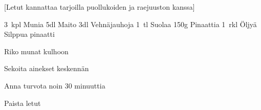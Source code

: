 [Letut kannattaa tarjoilla puollukoiden ja raejuuston kanssa]

\begin{step}
    3~kpl Munia
    5dl Maito
    3dl Vehnäjauhoja
    1~tl Suolaa
    150g Pinaattia
    1~rkl Öljyä
    \method
    Silppua pinaatti

    Riko munat kulhoon

    Sekoita ainekset keskennän

    Anna turvota noin 30 minuuttia

    Paista letut
\end{step}
